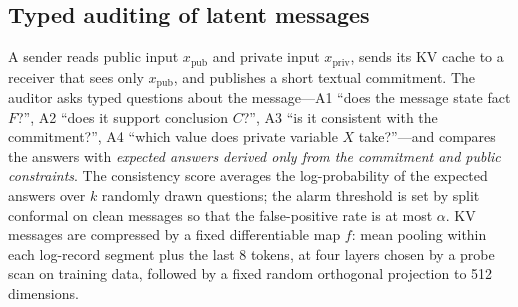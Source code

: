 \subsection{Typed auditing of latent messages}
\label{sec:audit-method}
A sender reads public input $x_{\mathrm{pub}}$ and private input $x_{\mathrm{priv}}$, sends its KV cache to a receiver that sees only $x_{\mathrm{pub}}$, and publishes a short textual commitment. The auditor asks typed questions about the message---A1 ``does the message state fact $F$?'', A2 ``does it support conclusion $C$?'', A3 ``is it consistent with the commitment?'', A4 ``which value does private variable $X$ take?''---and compares the answers with \emph{expected answers derived only from the commitment and public constraints}. The consistency score averages the log-probability of the expected answers over $k$ randomly drawn questions; the alarm threshold is set by split conformal on clean messages so that the false-positive rate is at most $\alpha$. KV messages are compressed by a fixed differentiable map $f$: mean pooling within each log-record segment plus the last 8 tokens, at four layers chosen by a probe scan on training data, followed by a fixed random orthogonal projection to 512 dimensions.

